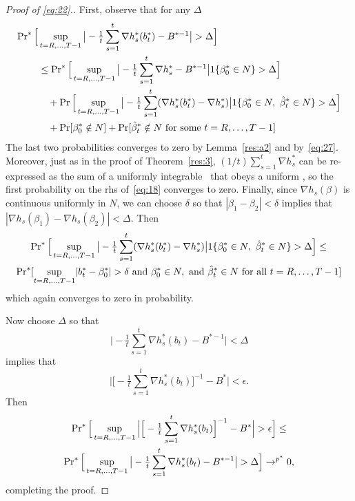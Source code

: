 \documentclass[12pt,fleqn]{article}
\begin{document}
\begin{proof}[Proof of \eqref{eq:22}.]
First, observe that for any $\Delta$
\begin{align}\label{eq:18}
  \pr^*\Big[&\sup_{t = R,\dots,T-1} \big\lvert - \tfrac{1}{t} \sum_{s=1}^t \nabla h_s^*(b_t^*) - B^{*-1} \big\rvert > \Delta \Big] \\
  &\leq \pr^*\Big[\sup_{t=R,\dots,T-1} \big\lvert - \tfrac{1}{t} \sum_{s=1}^t \nabla h_s^* - B^{*-1} \big\rvert 1\{\beta_0^* \in N\}> \Delta \Big]\\
  &\quad + \pr\Big[\sup_{t=R,\dots,T-1} \big\lvert - \tfrac{1}{t} \sum_{s=1}^t (\nabla h_s^*(b_t^*) - \nabla h_s^*) \big\rvert 1\{\beta_0^* \in N,\ \bh_t^* \in N\} > \Delta \Big] \\
  &\quad + \pr[\beta_0^* \notin N] + \pr[\bh_t^* \notin N \text{\ for some\ } t = R,\dots,T-1]
\end{align}
The last two probabilities converges to zero by
Lemma~\ref{res:a2} and by~\eqref{eq:27}.  Moreover, just as in the proof of
Theorem~\ref{res:3}, $(1/t) \sum_{s=1}^t \nabla h_s^*$ can
be re-expressed as the sum of a uniformly integrable \mds\ that obeys
a uniform \lln, so the first probability on the rhs of~\eqref{eq:18}
converges to zero. Finally, since $\nabla h_s(\beta)$ is continuous
uniformly in $N$, we can choose $\delta$ so that $|\beta_1 - \beta_2|
< \delta$ implies that $|\nabla h_s(\beta_1) - \nabla h_s(\beta_2)| < \Delta$. Then
\begin{multline*}
  \pr^*\Big[\sup_{t=R,\dots,T-1} \big\lvert - \tfrac{1}{t} \sum_{s=1}^t
  (\nabla h_s^*(b_t^*) - \nabla h_s^*) \big\rvert 1\{\beta_0^* \in N,\ \bh_t^* \in N\} > \Delta \Big]
  \leq \\
  \pr^*[\sup_{t=R,\dots,T-1}  \lvert b_t^* - \btrue^* \rvert > \delta\text{\ and\ }
  \btrue^* \in N,\text{\ and\ } \bh_t^* \in N \text{\ for all\ } t = R,\dots,T-1]
\end{multline*}
which again converges to zero in probability.

Now choose $\Delta$ so that
\begin{equation*}
  \big| - \tfrac{1}{t} \sum_{s=1}^t \nabla h_s^*(b_t) - B^{*-1} \big| < \Delta
\end{equation*}
implies that
\begin{equation*}
\Big|\Big[- \tfrac{1}{t} \sum_{s=1}^t \nabla h_s^*(b_t)\Big]^{-1} - B^*\Big| < \epsilon.
\end{equation*}
Then
\begin{multline*}
  \operatorname{Pr}^*\Big[\sup_{t=R,\dots,T-1} \Big\lvert\Big[- \tfrac{1}{t} \sum_{s=1}^t
  \nabla h_s^*(b_t)\Big]^{-1} - B^*\Big\rvert > \epsilon\Big] \leq \\
  \operatorname{Pr}^*\Big[\sup_{t=R,\dots,T-1}\big\lvert - \tfrac{1}{t} \sum_{s=1}^t
  \nabla h_s^*(b_t) - B^{*-1}\big\rvert > \Delta\Big]
  \to^{p^*} 0,
\end{multline*}
completing the proof.
\end{proof}
\end{document}
